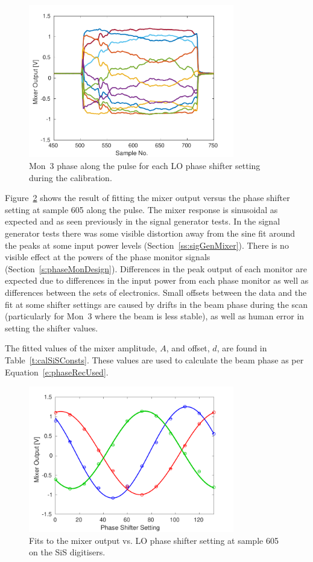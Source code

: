 \begin{figure}
  \centering
  \includegraphics[width=0.8\textwidth]{Figures/phaseMons/mon3AllPoints}
  \caption{Mon~3 phase along the pulse for each LO phase shifter setting during the calibration.}
  \label{f:mon3AllPoints}
\end{figure}

Figure~\ref{f:calSiS} shows the result of fitting the mixer output versus the phase shifter setting at sample 605 along the pulse. The mixer response is sinusoidal as expected and as seen previously in the signal generator tests. In the signal generator tests there was some visible distortion away from the sine fit around the peaks at some input power levels (Section~\ref{ss:sigGenMixer}). There is no visible effect at the powers of the phase monitor signals (Section~\ref{s:phaseMonDesign}). Differences in the peak output of each monitor are expected due to differences in the input power from each phase monitor as well as differences between the sets of electronics. Small offsets between the data and the fit at some shifter settings are caused by drifts in the beam phase during the scan (particularly for Mon~3 where the beam is less stable), as well as human error in setting the shifter values.

The fitted values of the mixer amplitude, \(A\), and offset, \(d\), are found in Table~\ref{t:calSiSConsts}. These values are used to calculate the beam phase as per Equation~\ref{e:phaseRecUsed}. 

\begin{figure}
  \centering
  \includegraphics[width=0.8\textwidth]{Figures/phaseMons/calSiS}
  \caption{Fits to the mixer output vs. LO phase shifter setting at sample 605 on the SiS digitisers.}
  \label{f:calSiS}
\end{figure}

